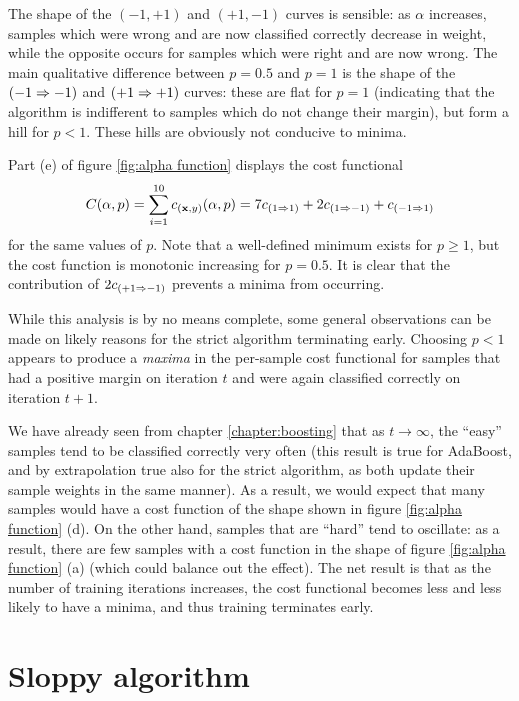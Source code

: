 The shape of the $(-1, +1)$ and $(+1, -1)$ curves is
sensible: as $\alpha$ increases, samples which were wrong and are now
classified correctly decrease in weight, while the opposite occurs for
samples which were right and are now wrong.  The main qualitative
difference between $p=0.5$ and $p=1$ is the shape of the $(-1 \Rightarrow -1)$
and $(+1 \Rightarrow +1)$ curves: these are flat for $p=1$ (indicating that
the algorithm is indifferent to samples which do not change their
margin), but form a hill for $p < 1$.  These hills are obviously not
conducive to minima.

Part (e) of figure \ref{fig:alpha function} displays the cost
functional 
%
\begin{equation}
C(\alpha,p) = \sum_{i=1}^{10} c_{(\mathbf{x}, y)}(\alpha, p) 
= 7c_{(1 \Rightarrow 1)} + 2c_{(1 \Rightarrow -1)} + c_{(-1 \Rightarrow 1)}
\end{equation}
%
for the same values of $p$.  Note that a well-defined minimum exists
for $p \geq 1$, but the cost function is monotonic increasing for $p =
0.5$.  It is clear that the contribution of $2c_{(+1 \Rightarrow -1)}$
prevents a minima from occurring.

While this analysis is by no means complete, some general observations
can be made on likely reasons for the strict algorithm terminating
early.  Choosing $p < 1$ appears to produce a \emph{maxima} in the
per-sample cost functional for samples that had a positive margin on
iteration $t$ and were again classified correctly on iteration $t+1$.

We have already seen from chapter \ref{chapter:boosting} that as $t
\rightarrow \infty$, the ``easy'' samples tend to be classified
correctly very often (this result is true for AdaBoost, and by
extrapolation true also for the strict algorithm, as both update their
sample weights in the same manner).  As a result, we would expect that
many samples would have a cost function of the shape shown in figure
\ref{fig:alpha function} (d).  On the other hand, samples that are
``hard'' tend to oscillate: as a result, there are few samples with a
cost function in the shape of figure \ref{fig:alpha function} (a)
(which could balance out the effect).  The net result is that as the
number of training iterations increases, the cost functional becomes
less and less likely to have a minima, and thus training terminates
early.

\section{Sloppy algorithm}

